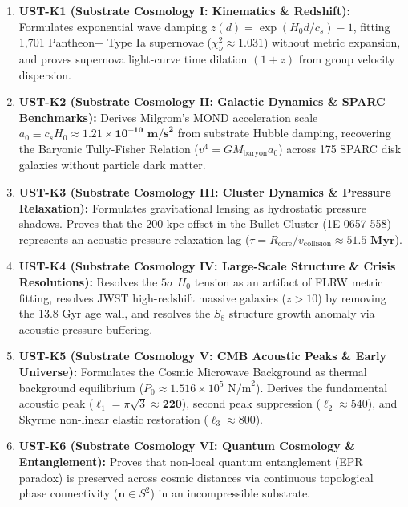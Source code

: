 \documentclass[11pt,a4paper]{article}
\begin{document}
	\begin{enumerate}
		\item \textbf{UST-K1 (Substrate Cosmology I: Kinematics \& Redshift):} Formulates exponential wave damping $z(d) = \exp(H_0 d/c_s) - 1$, fitting 1,701 Pantheon+ Type Ia supernovae ($\chi^2_\nu \approx 1.031$) without metric expansion, and proves supernova light-curve time dilation $(1+z)$ from group velocity dispersion.
		
		\item \textbf{UST-K2 (Substrate Cosmology II: Galactic Dynamics \& SPARC Benchmarks):} Derives Milgrom's MOND acceleration scale $a_0 \equiv c_s H_0 \approx \mathbf{1.21 \times 10^{-10} \text{ m/s}^2}$ from substrate Hubble damping, recovering the Baryonic Tully-Fisher Relation ($v^4 = G M_{\text{baryon}} a_0$) across 175 SPARC disk galaxies without particle dark matter.
		
		\item \textbf{UST-K3 (Substrate Cosmology III: Cluster Dynamics \& Pressure Relaxation):} Formulates gravitational lensing as hydrostatic pressure shadows. Proves that the $200 \text{ kpc}$ offset in the Bullet Cluster (1E 0657-558) represents an acoustic pressure relaxation lag ($\tau = R_{\text{core}} / v_{\text{collision}} \approx \mathbf{51.5 \text{ Myr}}$).
		
		\item \textbf{UST-K4 (Substrate Cosmology IV: Large-Scale Structure \& Crisis Resolutions):} Resolves the $5\sigma$ $H_0$ tension as an artifact of FLRW metric fitting, resolves JWST high-redshift massive galaxies ($z > 10$) by removing the 13.8 Gyr age wall, and resolves the $S_8$ structure growth anomaly via acoustic pressure buffering.
		
		\item \textbf{UST-K5 (Substrate Cosmology V: CMB Acoustic Peaks \& Early Universe):} Formulates the Cosmic Microwave Background as thermal background equilibrium ($P_0 \approx 1.516 \times 10^5 \text{ N/m}^2$). Derives the fundamental acoustic peak ($\ell_1 = \pi\sqrt{3} \approx \mathbf{220}$), second peak suppression ($\ell_2 \approx 540$), and Skyrme non-linear elastic restoration ($\ell_3 \approx 800$).
		
		\item \textbf{UST-K6 (Substrate Cosmology VI: Quantum Cosmology \& Entanglement):} Proves that non-local quantum entanglement (EPR paradox) is preserved across cosmic distances via continuous topological phase connectivity ($\mathbf{n} \in S^2$) in an incompressible substrate.
	\end{enumerate}
	
\end{document}
